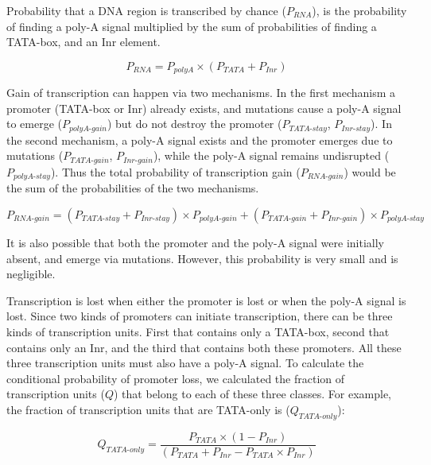 \documentclass[12pt,a4paper]{article}
\begin{document}
Probability that a DNA region is transcribed by chance ($P_\textit{RNA}$), is the probability of finding a poly-A signal multiplied by the sum of probabilities of finding a TATA-box, and an Inr element. 

\begin{equation}
P_\textit{RNA} = P_\textit{polyA} \times (P_\textit{TATA} + P_\textit{Inr})
\label{eqrnaprob}
\end{equation}

Gain of transcription can happen via two mechanisms. In the first mechanism a promoter (TATA-box or Inr) already exists, and mutations cause a poly-A signal to emerge ($P_\textit{polyA-gain}$) but do not destroy the promoter ($P_\textit{TATA-stay}$,  $P_\textit{Inr-stay}$). In the second mechanism, a poly-A signal exists and the promoter emerges due to mutations ($P_\textit{TATA-gain}$,  $P_\textit{Inr-gain}$), while the poly-A signal remains undisrupted ($P_\textit{polyA-stay}$). Thus the total probability of transcription gain ($P_\textit{RNA-gain}$) would be the sum of the probabilities of the two mechanisms.

\begin{equation}
P_\textit{RNA-gain} = (P_\textit{TATA-stay} + P_\textit{Inr-stay})\times P_\textit{polyA-gain} + (P_\textit{TATA-gain} + P_\textit{Inr-gain})\times P_\textit{polyA-stay}
\label{eqrnagain}
\end{equation}

It is also possible that both the promoter and the poly-A signal were initially absent, and emerge via mutations. However, this probability is very small and is negligible.

Transcription is lost when either the promoter is lost or when the poly-A signal is lost. Since two kinds of promoters can initiate transcription, there can be three kinds of transcription units. First that contains only a TATA-box, second that contains only an Inr, and the third that contains both these promoters. All these three transcription units must also have a poly-A signal. To calculate the conditional probability of promoter loss, we calculated the fraction of transcription units ($Q$) that belong to each of these three classes. For example, the fraction of transcription units that are TATA-only is ($Q_\textit{TATA-only}$):

\begin{equation*}
Q_\textit{TATA-only} = \frac{P_\textit{TATA}\times(1 - P_\textit{Inr})}{(P_\textit{TATA} + P_\textit{Inr} - P_\textit{TATA}\times P_\textit{Inr})}
\end{equation*}
\end{document}
